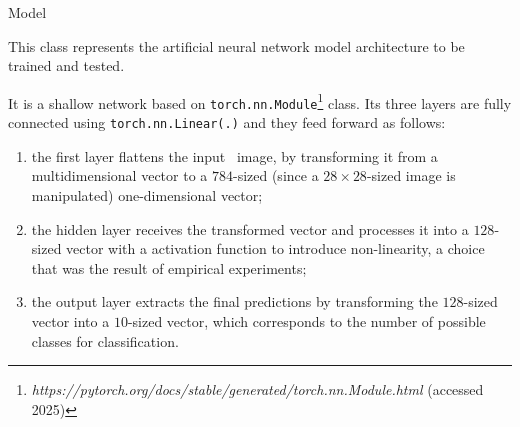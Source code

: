 \begin{section}{Model}
    \par This class represents the artificial neural network model architecture to be trained and tested.
    \par It is a shallow network based on \texttt{torch.nn.Module}\footnote{\textit{https://pytorch.org/docs/stable/generated/torch.nn.Module.html} (accessed 2025)} class. Its three layers are fully connected using \texttt{torch.nn.Linear(.)} and they feed forward as follows:
    \begin{enumerate}
        \item the first layer flattens the input~ image, by transforming it from a multidimensional vector to a $784$-sized (since a $28 \times 28$-sized image is manipulated) one-dimensional vector;
        \item the hidden layer receives the transformed vector and processes it into a $128$-sized vector with a  activation function to introduce non-linearity, a choice that was the result of empirical experiments;
        \item the output layer extracts the final predictions by transforming the $128$-sized vector into a $10$-sized vector, which corresponds to the number of possible classes for classification.
    \end{enumerate}
\end{section}
